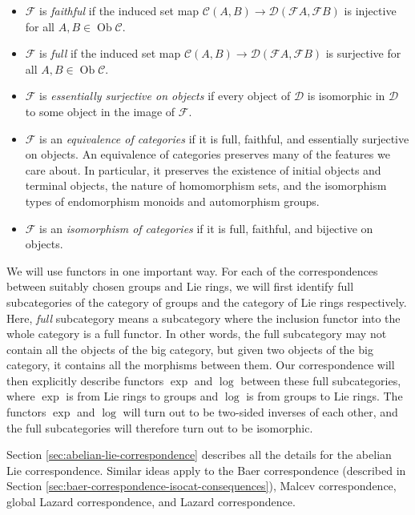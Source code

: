 \begin{itemize}
\item $\mathcal{F}$ is {\em faithful} if the induced set map
  $\mathcal{C}(A,B) \to \mathcal{D}(\mathcal{F}A,\mathcal{F}B)$ is
  injective for all $A,B \in \operatorname{Ob}\mathcal{C}$.
\item $\mathcal{F}$ is {\em full} if the induced set map
  $\mathcal{C}(A,B) \to \mathcal{D}(\mathcal{F}A,\mathcal{F}B)$ is
  surjective for all $A,B\in \operatorname{Ob}\mathcal{C}$.
\item $\mathcal{F}$ is {\em essentially surjective on objects} if
  every object of $\mathcal{D}$ is isomorphic in $\mathcal{D}$ to some
  object in the image of $\mathcal{F}$.
\item $\mathcal{F}$ is an {\em equivalence of categories} if it is
  full, faithful, and essentially surjective on objects. An
  equivalence of categories preserves many of the features we care
  about. In particular, it preserves the existence of initial objects
  and terminal objects, the nature of homomorphism sets, and the
  isomorphism types of endomorphism monoids and automorphism groups.
\item $\mathcal{F}$ is an {\em isomorphism of categories} if it is
  full, faithful, and bijective on objects.
\end{itemize}

We will use functors in one important way. For each of the
correspondences between suitably chosen groups and Lie rings, we will
first identify full subcategories of the category of groups and the
category of Lie rings respectively. Here, {\em full} subcategory means
a subcategory where the inclusion functor into the whole category is a
full functor. In other words, the full subcategory may not contain all
the objects of the big category, but given two objects of the big
category, it contains all the morphisms between them. Our
correspondence will then explicitly describe functors $\exp$ and
$\log$ between these full subcategories, where $\exp$ is from Lie
rings to groups and $\log$ is from groups to Lie rings. The functors
$\exp$ and $\log$ will turn out to be two-sided inverses of each
other, and the full subcategories will therefore turn out to be
isomorphic.

Section \ref{sec:abelian-lie-correspondence} describes all the details
for the abelian Lie correspondence. Similar ideas apply to the Baer
correspondence (described in Section
\ref{sec:baer-correspondence-isocat-consequences}), Malcev
correspondence, global Lazard correspondence, and Lazard
correspondence.

